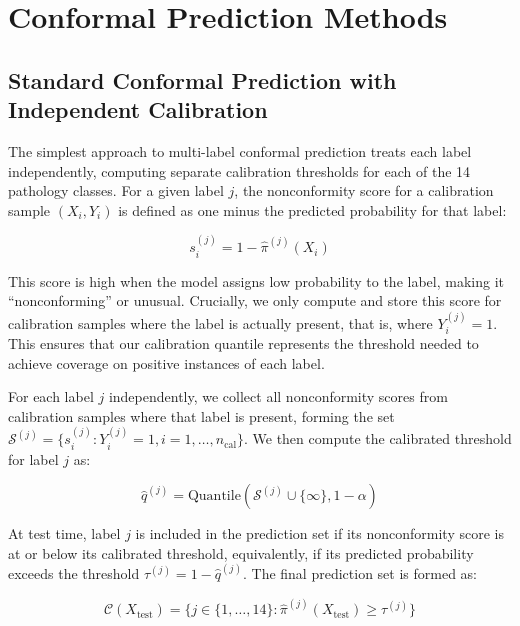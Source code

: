 \section{Conformal Prediction Methods}
\label{sec:conformal-prediction-methods}

\subsection{Standard Conformal Prediction with Independent Calibration}
\label{subsec:standard-conformal-prediction-with-independent-calibration}

The simplest approach to multi-label conformal prediction treats each label independently, computing separate calibration thresholds for each of the 14 pathology classes.
For a given label $j$, the nonconformity score for a calibration sample $(X_i, Y_i)$ is defined as one minus the predicted probability for that label:

\begin{equation}
s_i^{(j)} = 1 - \hat{\pi}^{(j)}(X_i)\label{eq:equation5}
\end{equation}

This score is high when the model assigns low probability to the label, making it ``nonconforming'' or unusual.
Crucially, we only compute and store this score for calibration samples where the label is actually present, that is, where $Y_i^{(j)} = 1$.
This ensures that our calibration quantile represents the threshold needed to achieve coverage on positive instances of each label.

For each label $j$ independently, we collect all nonconformity scores from calibration samples where that label is present, forming the set $\mathcal{S}^{(j)} = \{s_i^{(j)} : Y_i^{(j)} = 1, i = 1, \ldots, n_{\text{cal}}\}$.
We then compute the calibrated threshold for label $j$ as:

\begin{equation}
\hat{q}^{(j)} = \text{Quantile}(\mathcal{S}^{(j)} \cup \{\infty\}, 1-\alpha)\label{eq:equation6}
\end{equation}

At test time, label $j$ is included in the prediction set if its nonconformity score is at or below its calibrated threshold, equivalently, if its predicted probability exceeds the threshold $\tau^{(j)} = 1 - \hat{q}^{(j)}$.
The final prediction set is formed as:

\begin{equation}
\mathcal{C}(X_{\text{test}}) = \{j \in \{1,\ldots,14\} : \hat{\pi}^{(j)}(X_{\text{test}}) \geq \tau^{(j)}\}\label{eq:equation7}
\end{equation}

